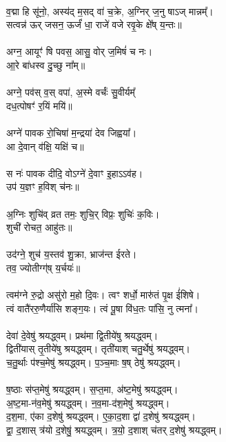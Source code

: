 \\
व॒द्मा हि सू॑नो॒, अस्य॑द् म॒सद् वा॑ च॒क्रे, अ॒ग्निर् ज॒नु षाऽज् मान्नम्᳚।\\
सत्वन्न॑ ऊर् जसन॒ ऊर्जं॑ धा॒ राजे॑ वजे रवृ॒के क्षे᳚ष् य॒न्तः॥\\
\\
अग्न॒ आयूꣳ॑ षि पवस॒ आसु॒ वोर् ज॒मिषं॑ च नः।\\
आ॒रे बा॑धस्व दु॒च्छु ना᳚म्॥\\
\\
अग्ने॒ पव॑स् व॒स् वपा॑, अ॒स्मे वर्चः॑॑ सु॒वीर्यम्᳚\\
दध॒त्पोषꣳ॑ र॒यिं मयि॑॥\\
\\
अग्ने॑ पावक रो॒चिषा॑ म॒न्द्रया॑ देव जिह्वया᳚।\\
आ दे॒वान् व॑क्षि॒ यक्षि॑ च॥\\
\\
स नः॑ पावक दीदि॒ वोऽग्ने॑ दे॒वाꣳ इ॒हाऽऽव॑ह।\\
उप॑ य॒ज्ञꣳ ह॒विश् च॑नः॥\\
\\
अ॒ग्निः शुचि॑व् व्रत तमः॒ शुचि॒र् विप्रः॒ शुचिः॑ क॒विः।\\
शुची॑ रोचत॒ आहु॑तः॥\\
\\
उद॑ग्ने॒ शुच॑ य॒स्तव॑ शु॒क्रा, भ्राज॑न्त ईरते।\\
तव॒ ज्योतीग्ग्॑ष् य॒र्चयः॑॥\\
\\
त्वम॑ग्ने रु॒द्रो असु॑रो म॒हो दि॒वः। त्वꣳ शर्धो॒ मारु॑तं पृ॒क्ष ई॑शिषे।\\
त्वं वातै॑ररु॒णैर्या॑सि शङ्ग॒यः। त्वं पू॒षा वि॑ध॒तः पा॑सि॒ नु त्मना᳚।\\
\\
देवा॑ दे॒वेषु॑ श्रयद्ध्वम्। प्रथ॑मा द्वि॒तीये॑षु श्रयद्ध्वम्। \\
द्विती॑यास् तृ॒तीये॑षु श्रयद्ध्वम्। तृती॑याश् चतु॒र्थेषु॑ श्रयद्ध्वम्। \\
च॒तु॒र्थाः प॑श्च॒मेषु॑ श्रयद्ध्वम्। प॒ञ्च॒माः ष॒ष् ठेषु॑ श्रयद्ध्वम्।\\
\\
ष॒ष्ठाः स॑प्त॒मेषु॑ श्रयद्ध्वम्। स॒प्त॒मा, अ॑ष्ट॒मेषु॑ श्रयद्ध्वम्। \\
अ॒ष्ट॒मा-न॑व॒मेषु॑ श्रयद्ध्वम्। न॒व॒मा-द॑श॒मेषु॑ श्रयद्ध्वम्। \\
द॒श॒मा, ए॑का द॒शेषु॑ श्रयद्ध्वम्। ए॒का॒द॒शा द्वा॑ द॒शेषु॑ श्रयद्ध्वम्। \\
द्वा॒ द॒शास् त्र॑यो द॒शेषु॒॑ श्रयद्ध्वम्। त्र॒यो॒ द॒शाश् च॑तर् द॒शेषु॑ श्रयद्ध्वम्। \\
